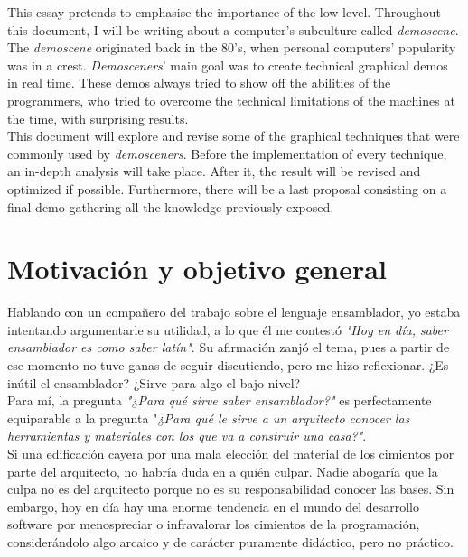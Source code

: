 This essay pretends to emphasise the importance of the low level. Throughout this document, I will be writing about a computer's subculture called \emph{demoscene}.\\

The \emph{demoscene} originated back in the 80's, when personal computers' popularity was in a crest. \emph{Demosceners}' main goal was to create technical graphical demos in real time. These demos always tried to show off the abilities of the programmers, who tried to overcome the technical limitations of the machines at the time, with surprising results.\\

This document will explore and revise some of the graphical techniques that were commonly used by \emph{demosceners}. Before the implementation of every technique, an in-depth analysis will take place. After it, the result will be revised and optimized if possible. Furthermore, there will be a last proposal consisting on a final demo gathering all the knowledge previously exposed.

\chapter*{Motivación y objetivo general}

\thispagestyle{empty}
\vspace{1cm}

Hablando con un compañero del trabajo sobre el lenguaje ensamblador,
yo estaba intentando argumentarle su utilidad, a lo que él me contestó 
\emph{"Hoy en día, saber ensamblador es como saber latín"}.
Su afirmación zanjó el tema, pues a partir de ese momento no tuve ganas de
seguir discutiendo, pero me hizo reflexionar. ¿Es inútil el ensamblador?
¿Sirve para algo el bajo nivel?\\

Para mí, la pregunta \emph{"¿Para qué sirve saber ensamblador?"} es perfectamente equiparable a la pregunta "\emph{¿Para qué le sirve a un arquitecto conocer las herramientas y materiales con los que va a construir una casa?"}.\\

Si una edificación cayera por una mala elección del material de los cimientos por parte del arquitecto, no habría duda en a quién culpar. Nadie abogaría que la culpa no es del arquitecto porque no es su responsabilidad conocer las bases.
Sin embargo, hoy en día hay una enorme tendencia en el mundo del desarrollo software por menospreciar o infravalorar los cimientos de la programación, considerándolo algo arcaico y de carácter puramente didáctico, pero no
práctico.\\ 

